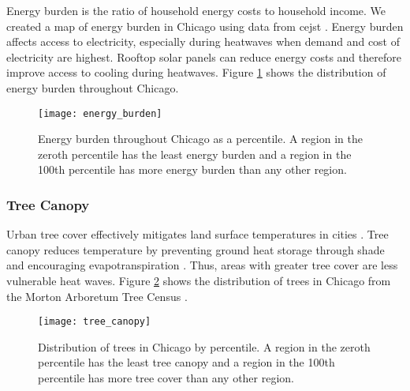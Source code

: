 Energy burden is the ratio of household energy costs to household income. We created
a map of energy burden in Chicago using data from \ac{cejst}
\cite{council_on_environmental_quality_climate_nodate}. Energy
burden affects access to electricity, especially during heatwaves when demand
and cost of electricity are highest. Rooftop solar panels can reduce energy costs
and therefore improve access to cooling during heatwaves. Figure \ref{fig:eb} shows
the distribution of energy burden throughout Chicago.

\begin{figure}[H]
    \begin{center}
      \texttt{[image: energy\_burden]}
      \caption{Energy burden throughout Chicago as a percentile. A region in the zeroth
      percentile has the least energy burden and a region in the 100th percentile has
      more energy burden than any other region.}
      \label{fig:eb}
    \end{center}
\end{figure}

\subsubsection{Tree Canopy}

Urban tree cover effectively mitigates land surface temperatures in cities
\cite{loughner_roles_2012, schwaab_role_2021, mcdonald_tree_2021}. Tree canopy
reduces temperature by preventing ground heat storage through shade and encouraging
evapotranspiration \cite{mcdonald_tree_2021}. Thus, areas with greater tree cover
are less vulnerable heat waves. Figure \ref{fig:tree_census} shows the distribution
of trees in Chicago from the Morton Arboretum Tree Census \cite{kua_chicago_2020}.

\begin{figure}[H]
    \begin{center}
      \texttt{[image: tree\_canopy]}
      \caption{Distribution of trees in Chicago by percentile. A region in the zeroth
      percentile has the least tree canopy and a region in the 100th percentile has
      more tree cover than any other region.}
      \label{fig:tree_census}
    \end{center}
\end{figure}

